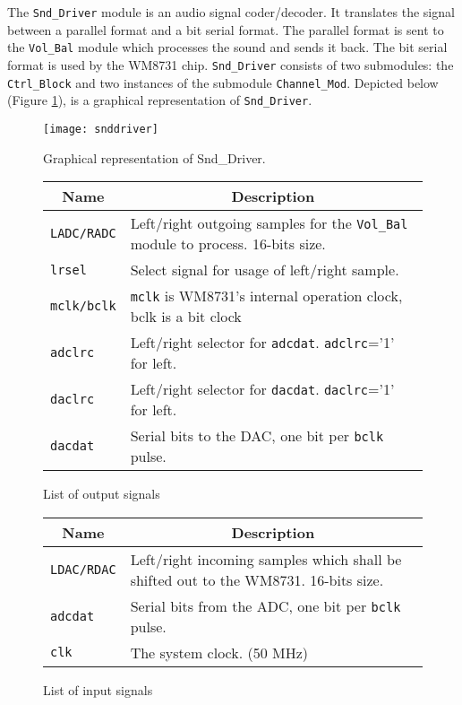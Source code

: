 The \verb?Snd_Driver? module is an audio signal coder/decoder. It translates the signal between a parallel format and a bit serial format. The parallel format is sent to the \verb?Vol_Bal? module which processes the sound and sends it back. The bit serial format is used by the WM8731 chip. \verb?Snd_Driver? consists of two submodules: the \verb?Ctrl_Block? and two instances of the submodule \verb?Channel_Mod?. Depicted below (Figure \ref{fig:snddriver}), is a graphical representation of \verb?Snd_Driver?. 

\begin{figure}[H]
  \centering
  \texttt{[image: snddriver]}
  \caption{Graphical representation of Snd\_Driver.}
  \label{fig:snddriver}
\end{figure}

\begin{figure}[H]
  \centering
  \caption{List of output signals}
  \label{tab:outputs}
    \begin{tabular}{|l|l|}     
      \hline
      \multicolumn{1}{|c|}{Name} & \multicolumn{1}{c|}{Description} \\
      \hline
      \verb=LADC/RADC= & Left/right outgoing samples for the \verb?Vol_Bal? module to process. 16-bits size.\\
      \hline
      \verb=lrsel= & Select signal for usage of left/right sample.\\
      \hline
      \verb=mclk/bclk= & \verb=mclk= is WM8731's internal operation clock, bclk is a bit clock\\
      \hline
      \verb=adclrc= & Left/right selector for \verb=adcdat=. \verb=adclrc==’1’ for left.\\
      \hline
      \verb=daclrc= & Left/right selector for \verb=dacdat=. \verb=daclrc==’1’ for left.\\
      \hline
      \verb=dacdat= & Serial bits to the DAC, one bit per \verb=bclk= pulse.\\
      \hline
    \end{tabular}
\end{figure}

\begin{figure}[H]
  \centering
  \label{tab:inputs}
  \caption{List of input signals}
    \begin{tabular}{|l|l|}     
        \hline
        \multicolumn{1}{|c|}{Name} & \multicolumn{1}{c|}{Description} \\
        \hline
        \verb=LDAC/RDAC= & Left/right incoming samples which shall be shifted out to the WM8731. 16-bits size.\\
        \hline
        \verb=adcdat= & Serial bits from the ADC, one bit per \verb=bclk= pulse.\\
        \hline
        \verb=clk= & The system clock. (50 MHz)\\
        \hline
    \end{tabular}
\end{figure}

